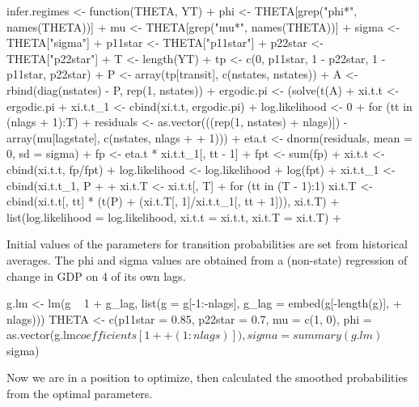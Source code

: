 \documentclass[a4paper]{article}
\renewcommand{\~}{\perispomeni}%
\begin{document}
\begin{Schunk}
\begin{Sinput}
 infer.regimes <- function(THETA, YT) {
+     phi <- THETA[grep("phi*", names(THETA))]
+     mu <- THETA[grep("mu*", names(THETA))]
+     sigma <- THETA["sigma"]
+     p11star <- THETA["p11star"]
+     p22star <- THETA["p22star"]
+     T <- length(YT)
+     tp <- c(0, p11star, 1 - p22star, 1 - p11star, p22star)
+     P <- array(tp[transit], c(nstates, nstates))
+     A <- rbind(diag(nstates) - P, rep(1, nstates))
+     ergodic.pi <- (solve(t(A) %
+     xi.t.t <- ergodic.pi %
+     xi.t.t_1 <- cbind(xi.t.t, ergodic.pi)
+     log.likelihood <- 0
+     for (tt in (nlags + 1):T) {
+         residuals <- as.vector(((rep(1, nstates) %
+             nlags)]) - array(mu[lagstate], c(nstates, nlags + 
+             1))) %
+         eta.t <- dnorm(residuals, mean = 0, sd = sigma)
+         fp <- eta.t * xi.t.t_1[, tt - 1]
+         fpt <- sum(fp)
+         xi.t.t <- cbind(xi.t.t, fp/fpt)
+         log.likelihood <- log.likelihood + log(fpt)
+         xi.t.t_1 <- cbind(xi.t.t_1, P %
+     }
+     xi.t.T <- xi.t.t[, T] %
+     for (tt in (T - 1):1) xi.t.T <- cbind(xi.t.t[, tt] * (t(P) %
+         (xi.t.T[, 1]/xi.t.t_1[, tt + 1])), xi.t.T)
+     list(log.likelihood = log.likelihood, xi.t.t = xi.t.t, xi.t.T = xi.t.T)
+ }
\end{Sinput}
\end{Schunk}
Initial values of the parameters for transition probabilities are set from historical averages.
The phi and sigma values are obtained from a (non-state) regression of change in GDP on 4 of its own lags.
\begin{Schunk}
\begin{Sinput}
 g.lm <- lm(g ~ 1 + g_lag, list(g = g[-1:-nlags], g_lag = embed(g[-length(g)], 
+     nlags)))
 THETA <- c(p11star = 0.85, p22star = 0.7, mu = c(1, 0), phi = as.vector(g.lm$coefficients[1 + 
+     (1:nlags)]), sigma = summary(g.lm)$sigma)
\end{Sinput}
\end{Schunk}
Now we are in a position to optimize, then calculated the smoothed probabilities from the
optimal parameters. 
\end{document}
